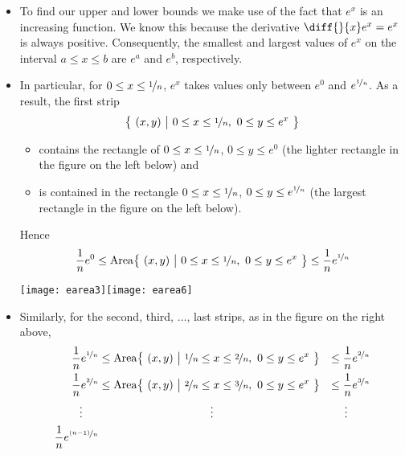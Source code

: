 \begin{itemize}
 \item To find our upper and lower bounds we make use of the fact that $e^x$ is an
increasing function. We know this because the derivative $\diff{}{x}e^x=e^x$  is always
positive. Consequently, the smallest and largest values of $e^x$ on the interval
$a\le x\le b$ are $e^a$ and $e^b$, respectively.

\item In particular, for $0\le x\le \nicefrac{1}{n}$,
$e^x$ takes values only between $e^0$ and $e^{\nicefrac{1}{n}}$.
As a result,  the first strip
\begin{align*}
\big\{\ (x,y)\ \big|\ 0\le x\le \nicefrac{1}{n},\ 0\le y\le e^x\ \big\}
\end{align*}
\begin{itemize}
\item contains the rectangle of $0\le x\le \nicefrac{1}{n}$, $0\le y\le e^0$
(the lighter rectangle in the figure on the left below) and
\item is contained in the rectangle $0\le x\le \nicefrac{1}{n}$, $0\le y\le
e^{\nicefrac{1}{n}}$
(the largest rectangle in the figure on the left below).
\end{itemize}
Hence
\begin{align*}
\frac{1}{n}e^{0}
\le {\rm Area}
  \big\{\ (x,y)\ \big|\ 0\le x\le \nicefrac{1}{n},\ 0\le y\le e^x\ \big\}
\le \frac{1}{n}e^{\nicefrac{1}{n}}
\end{align*}
\begin{efig}
\begin{center}
   \texttt{[image: earea3]}\qquad \texttt{[image: earea6]}
\end{center}
\end{efig}
\item Similarly, for the second, third, $\dots$, last strips,
as in the figure on the right above,
\begin{alignat*}{3}
\frac{1}{n}e^{\nicefrac{1}{n}}
&\le {\rm Area}\big\{\ (x,y)\ \big|\
             \nicefrac{1}{n}\le x\le \nicefrac{2}{n},\ 0\le y\le e^x\ \big\}
&\le \frac{1}{n}e^{\nicefrac{2}{n}}\\
\frac{1}{n}e^{\nicefrac{2}{n}}
&\le {\rm Area}\big\{\ (x,y)\ \big|\
            \nicefrac{2}{n}\le x\le \nicefrac{3}{n},\ 0\le y\le e^x\ \big\}
&\le \frac{1}{n}e^{\nicefrac{3}{n}}\\
\vdots\hskip0.5cm &\hskip3.5cm \vdots &\vdots\hskip0.7cm\\
\frac{1}{n}e^{\nicefrac{(n-1)}{n}}

\end{alignat*}
\end{itemize}
